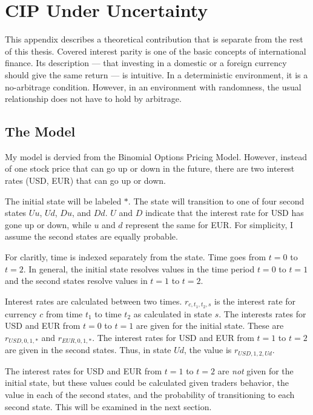 \section{CIP Under Uncertainty}

This appendix describes a theoretical contribution that is separate from the rest of this thesis.  Covered interest parity is one of the basic concepts of international finance.  Its description --- that investing in a domestic or a foreign currency should give the same return --- is intuitive.  In a deterministic environment, it is a no-arbitrage condition.  However, in an environment with randomness, the usual relationship does not have to hold by arbitrage.

\subsection{The Model}

My model is dervied from the Binomial Options Pricing Model\cite{Cox1979}.  However, instead of one stock price that can go up or down in the future, there are two interest rates (USD, EUR) that can go up or down.  

The initial state will be labeled $*$.  The state will transition to one of four second states $Uu$, $Ud$, $Du$, and $Dd$.  $U$ and $D$ indicate that the interest rate for USD has gone up or down, while $u$ and $d$ represent the same for EUR.  For simplicity, I assume the second states are equally probable.  

For claritly, time is indexed separately from the state.  Time goes from $t=0$ to $t=2$.  In general, the initial state resolves values in the time period $t=0$ to $t=1$ and the second states resolve values in $t=1$ to $t=2$. 

Interest rates are calculated between two times.  $r_{c,t_1,t_2,s}$ is the interest rate for currency $c$ from time $t_1$ to time $t_2$ as calculated in state $s$.  The interests rates for USD and EUR from $t=0$ to $t=1$ are given for the initial state.  These are $r_{USD,0,1,*}$ and $r_{EUR,0,1,*}$.  The interest rates for USD and EUR from $t=1$ to $t=2$ are given in the second states.  Thus, in state $Ud$, the value is $r_{USD,1,2,Ud}$.  

The interest rates for USD and EUR from $t=1$ to $t=2$ are \emph{not} given for the initial state, but these values could be calculated given traders behavior, the value in each of the second states, and the probability of transitioning to each second state.  This will be examined in the next section.

